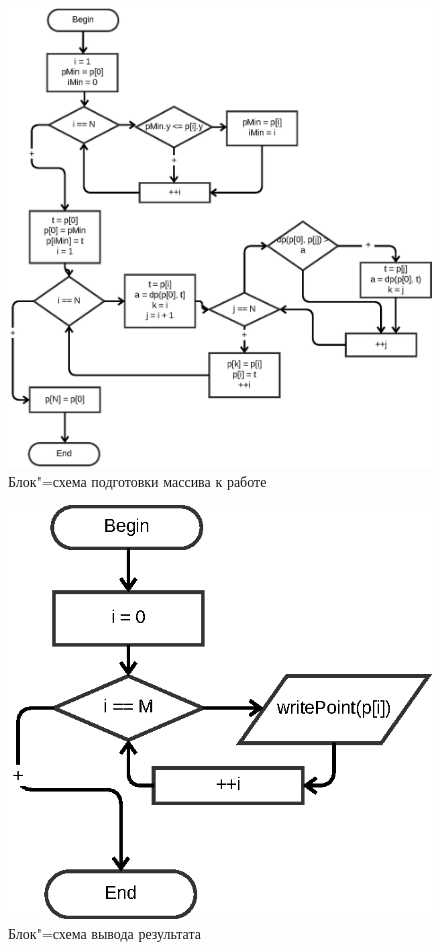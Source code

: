 \documentclass[a4paper,12pt,notitlepage,headsepline,pdftex]{scrartcl}
\begin{document}
    \begin{figure}[h]
      \begin{center}
        \includegraphics{sort.eps}
      \end{center}
      \caption{Блок"=схема подготовки массива к работе}
      \label{fig:sort}
    \end{figure}

    \begin{figure}[h]
      \begin{center}
        \includegraphics{output.eps}
      \end{center}
      \caption{Блок"=схема вывода результата}
      \label{fig:output}
    \end{figure}
    \clearpage
\end{document}
